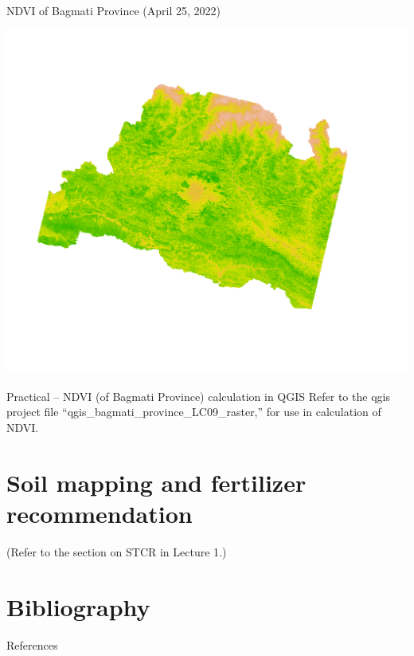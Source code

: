 \documentclass[11pt,dvipsnames,ignorenonframetext,aspectratio=169]{beamer}
\begin{document}
\begin{frame}{NDVI of Bagmati Province (April 25, 2022)}
\protect\hypertarget{ndvi-of-bagmati-province-april-25-2022}{}
\begin{center}\includegraphics[width=0.7\linewidth]{../images/r_lc09_bagmati_raster_ndvi_value} \end{center}
\end{frame}

\begin{frame}{Practical -- NDVI (of Bagmati Province) calculation in
QGIS}
\protect\hypertarget{practical-ndvi-of-bagmati-province-calculation-in-qgis}{}
Refer to the qgis project file
``qgis\_bagmati\_province\_LC09\_raster,'' for use in calculation of
NDVI.
\end{frame}

\hypertarget{soil-mapping-and-fertilizer-recommendation}{%
\section{Soil mapping and fertilizer
recommendation}\label{soil-mapping-and-fertilizer-recommendation}}

\begin{frame}{}
\protect\hypertarget{section-9}{}
(Refer to the section on STCR in Lecture 1.)
\end{frame}

\hypertarget{bibliography}{%
\section{Bibliography}\label{bibliography}}

\begin{frame}{References}
\protect\hypertarget{references}{}
\end{frame}
\end{document}
